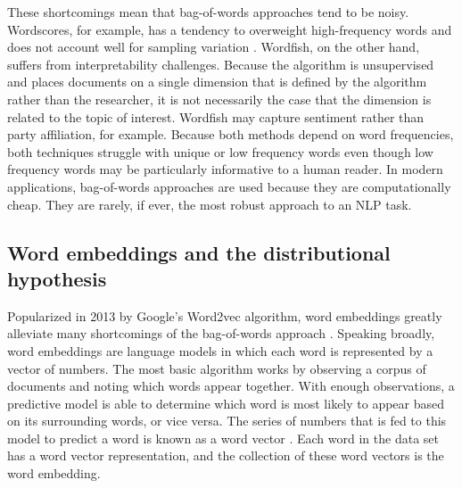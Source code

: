 \documentclass[../embeddings.tex]{subfiles}
\begin{document}
These shortcomings mean that bag-of-words approaches tend to be noisy. Wordscores, for example, has a tendency to overweight high-frequency words and does not account well for sampling variation \cite{monroe2008fightin, lowe2008understanding}. Wordfish, on the other hand, suffers from interpretability challenges. Because the algorithm is unsupervised and places documents on a single dimension that is defined by the algorithm rather than the researcher, it is not necessarily the case that the dimension is related to the topic of interest. Wordfish may capture sentiment rather than party affiliation, for example. Because both methods depend on word frequencies, both techniques struggle with unique or low frequency words even though low frequency words may be particularly informative to a human reader. In modern applications, bag-of-words approaches are used because they are computationally cheap. They are rarely, if ever, the most robust approach to an NLP task.

\subsection{Word embeddings and the distributional hypothesis}
Popularized in 2013 by Google’s Word2vec algorithm, word embeddings greatly alleviate many shortcomings of the bag-of-words approach \cite{mikolov2013efficient}. Speaking broadly, word embeddings are language models in which each word is represented by a vector of numbers. The most basic algorithm works by observing a corpus of documents and noting which words appear together. With enough observations, a predictive model is able to determine which word is most likely to appear based on its surrounding words, or vice versa. The series of numbers that is fed to this model to predict a word is known as a word vector \cite{goldberg2014word2vec}. Each word in the data set has a word vector representation, and the collection of these word vectors is the word embedding.
\end{document}

